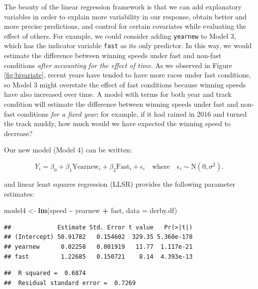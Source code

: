 \documentclass[
]{krantz}
\newenvironment{Shaded}{\begin{snugshade}}{\end{snugshade}}
\newcommand{\AttributeTok}[1]{\textcolor[rgb]{0.27,0.27,0.27}{#1}}
\newcommand{\FunctionTok}[1]{\textcolor[rgb]{0.27,0.27,0.27}{\textbf{#1}}}
\newcommand{\NormalTok}[1]{#1}
\newcommand{\OtherTok}[1]{\textcolor[rgb]{0.37,0.37,0.37}{#1}}
\newcommand{\SpecialCharTok}[1]{\textcolor[rgb]{0.43,0.43,0.43}{\textbf{#1}}}
\begin{document}
The beauty of the linear regression framework is that we can add explanatory variables in order to explain more variability in our response, obtain better and more precise predictions, and control for certain covariates while evaluating the effect of others. For example, we could consider adding \texttt{yearnew} to Model 3, which has the indicator variable \texttt{fast} as its only predictor. In this way, we would estimate the difference between winning speeds under fast and non-fast conditions \emph{after accounting for the effect of time}. As we observed in Figure \ref{fig:bivariate}, recent years have tended to have more races under fast conditions, so Model 3 might overstate the effect of fast conditions because winning speeds have also increased over time. A model with terms for both year and track condition will estimate the difference between winning speeds under fast and non-fast conditions \emph{for a fixed year}; for example, if it had rained in 2016 and turned the track muddy, how much would we have expected the winning speed to decrease?

Our new model (Model 4) can be written:

\begin{equation}
Y_{i}=\beta_{0}+\beta_{1}\textrm{Yearnew}_{i}+\beta_{2}\textrm{Fast}_{i}+\epsilon_{i}\quad \textrm{where}\quad \epsilon_{i}\sim \textrm{N}(0,\sigma^2).
\label{eq:model4}
\end{equation}

and linear least squares regression (LLSR) provides the following parameter estimates:

\begin{Shaded}
\begin{Highlighting}[]
\NormalTok{model4 }\OtherTok{\textless{}{-}} \FunctionTok{lm}\NormalTok{(speed }\SpecialCharTok{\textasciitilde{}}\NormalTok{ yearnew }\SpecialCharTok{+}\NormalTok{ fast, }\AttributeTok{data =}\NormalTok{ derby.df)}
\end{Highlighting}
\end{Shaded}

\begin{verbatim}
##             Estimate Std. Error t value   Pr(>|t|)
## (Intercept) 50.91782   0.154602  329.35 5.360e-178
## yearnew      0.02258   0.001919   11.77  1.117e-21
## fast         1.22685   0.150721    8.14  4.393e-13
\end{verbatim}

\begin{verbatim}
##  R squared =  0.6874 
##  Residual standard error =  0.7269
\end{verbatim}
\end{document}
